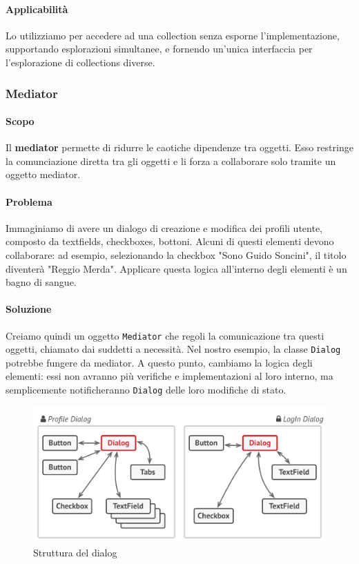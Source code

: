 \documentclass[11pt]{article}
\newcommand{\code}[1]{\texttt{#1}}
\begin{document}
\paragraph{Applicabilità}
Lo utilizziamo per accedere ad una collection senza esporne l'implementazione, supportando esplorazioni simultanee, e fornendo un'unica interfaccia per l'esplorazione di collections diverse.
\subsubsection{Mediator}
\paragraph{Scopo}
Il \textbf{mediator} permette di ridurre le caotiche dipendenze tra oggetti. Esso restringe la comunciazione diretta tra gli oggetti e li forza a collaborare solo tramite un oggetto mediator. 

\paragraph{Problema}
Immaginiamo di avere un dialogo di creazione e modifica dei profili utente, composto da textfields, checkboxes, bottoni. Alcuni di questi elementi devono collaborare: ad esempio, selezionando la checkbox "Sono Guido Soncini", il titolo diventerà "Reggio Merda". Applicare questa logica all'interno degli elementi è un bagno di sangue.
\paragraph{Soluzione}
Creiamo quindi un oggetto \code{Mediator} che regoli la comunicazione tra questi oggetti, chiamato dai suddetti a necessità. Nel nostro esempio, la classe \code{Dialog} potrebbe fungere da mediator. A questo punto, cambiamo la logica degli elementi: essi non avranno più verifiche e implementazioni al loro interno, ma semplicemente notificheranno \code{Dialog} delle loro modifiche di stato. 
\begin{figure}[H]
    \includegraphics[width=\linewidth]{res/teoria/Mediator.png}
    \caption{Struttura del dialog}
\end{figure}
\end{document}

